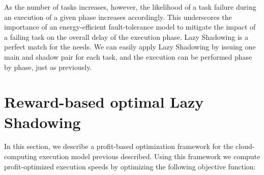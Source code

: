 As the number of tasks increases, however, the likelihood of a task
failure during an execution of a given phase increases
accordingly. This underscores the importance of an energy-efficient
fault-tolerance model to mitigate the impact of a failing task on the
overall delay of the execution phase. Lazy Shadowing is a perfect match for the needs. We can easily apply 
Lazy Shadowing by issuing one main and shadow pair for each task, and the execution can be performed phase 
by phase, just as previously. 

\section{Reward-based optimal Lazy Shadowing}

In this section, we describe a profit-based optimization framework for
the cloud-computing execution model previous described. Using this
framework we compute profit-optimized execution speeds by
optimizing the following objective function:








